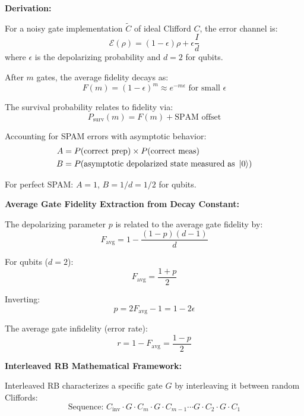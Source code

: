 \documentclass[11pt,a4paper]{article}
\theoremstyle{definition}
\theoremstyle{remark}
\begin{document}
\textbf{Derivation:}

For a noisy gate implementation $\tilde{C}$ of ideal Clifford $C$, the error channel is:
\begin{equation}
\mathcal{E}(\rho) = (1-\epsilon) \rho + \epsilon \frac{I}{d}
\end{equation}
where $\epsilon$ is the depolarizing probability and $d=2$ for qubits.

After $m$ gates, the average fidelity decays as:
\begin{equation}
F(m) = (1-\epsilon)^m \approx e^{-m\epsilon} \text{ for small } \epsilon
\end{equation}

The survival probability relates to fidelity via:
\begin{equation}
P_{\text{surv}}(m) = F(m) + \text{SPAM offset}
\end{equation}

Accounting for SPAM errors with asymptotic behavior:
\begin{align}
A &= P(\text{correct prep}) \times P(\text{correct meas}) \\
B &= P(\text{asymptotic depolarized state measured as } \ket{0})
\end{align}

For perfect SPAM: $A = 1$, $B = 1/d = 1/2$ for qubits.

\textbf{Average Gate Fidelity Extraction from Decay Constant:}

The depolarizing parameter $p$ is related to the average gate fidelity by:
\begin{equation}
F_{\text{avg}} = 1 - \frac{(1-p)(d-1)}{d}
\end{equation}

For qubits ($d=2$):
\begin{equation}
F_{\text{avg}} = \frac{1 + p}{2}
\end{equation}

Inverting:
\begin{equation}
p = 2F_{\text{avg}} - 1 = 1 - 2\epsilon
\end{equation}

The average gate infidelity (error rate):
\begin{equation}
r = 1 - F_{\text{avg}} = \frac{1-p}{2}
\end{equation}

\textbf{Interleaved RB Mathematical Framework:}

Interleaved RB characterizes a specific gate $G$ by interleaving it between random Cliffords:
\begin{equation}
\text{Sequence: } C_{\text{inv}} \cdot G \cdot C_m \cdot G \cdot C_{m-1} \cdots G \cdot C_2 \cdot G \cdot C_1
\end{equation}
\end{document}
